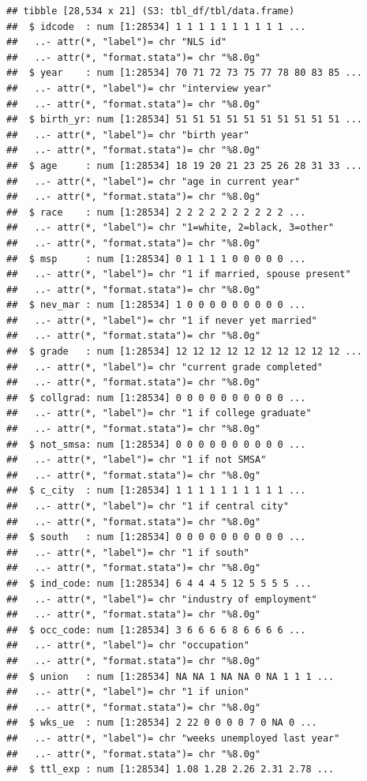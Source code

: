 \documentclass[
]{article}
\begin{document}
\begin{verbatim}
## tibble [28,534 x 21] (S3: tbl_df/tbl/data.frame)
##  $ idcode  : num [1:28534] 1 1 1 1 1 1 1 1 1 1 ...
##   ..- attr(*, "label")= chr "NLS id"
##   ..- attr(*, "format.stata")= chr "%8.0g"
##  $ year    : num [1:28534] 70 71 72 73 75 77 78 80 83 85 ...
##   ..- attr(*, "label")= chr "interview year"
##   ..- attr(*, "format.stata")= chr "%8.0g"
##  $ birth_yr: num [1:28534] 51 51 51 51 51 51 51 51 51 51 ...
##   ..- attr(*, "label")= chr "birth year"
##   ..- attr(*, "format.stata")= chr "%8.0g"
##  $ age     : num [1:28534] 18 19 20 21 23 25 26 28 31 33 ...
##   ..- attr(*, "label")= chr "age in current year"
##   ..- attr(*, "format.stata")= chr "%8.0g"
##  $ race    : num [1:28534] 2 2 2 2 2 2 2 2 2 2 ...
##   ..- attr(*, "label")= chr "1=white, 2=black, 3=other"
##   ..- attr(*, "format.stata")= chr "%8.0g"
##  $ msp     : num [1:28534] 0 1 1 1 1 0 0 0 0 0 ...
##   ..- attr(*, "label")= chr "1 if married, spouse present"
##   ..- attr(*, "format.stata")= chr "%8.0g"
##  $ nev_mar : num [1:28534] 1 0 0 0 0 0 0 0 0 0 ...
##   ..- attr(*, "label")= chr "1 if never yet married"
##   ..- attr(*, "format.stata")= chr "%8.0g"
##  $ grade   : num [1:28534] 12 12 12 12 12 12 12 12 12 12 ...
##   ..- attr(*, "label")= chr "current grade completed"
##   ..- attr(*, "format.stata")= chr "%8.0g"
##  $ collgrad: num [1:28534] 0 0 0 0 0 0 0 0 0 0 ...
##   ..- attr(*, "label")= chr "1 if college graduate"
##   ..- attr(*, "format.stata")= chr "%8.0g"
##  $ not_smsa: num [1:28534] 0 0 0 0 0 0 0 0 0 0 ...
##   ..- attr(*, "label")= chr "1 if not SMSA"
##   ..- attr(*, "format.stata")= chr "%8.0g"
##  $ c_city  : num [1:28534] 1 1 1 1 1 1 1 1 1 1 ...
##   ..- attr(*, "label")= chr "1 if central city"
##   ..- attr(*, "format.stata")= chr "%8.0g"
##  $ south   : num [1:28534] 0 0 0 0 0 0 0 0 0 0 ...
##   ..- attr(*, "label")= chr "1 if south"
##   ..- attr(*, "format.stata")= chr "%8.0g"
##  $ ind_code: num [1:28534] 6 4 4 4 5 12 5 5 5 5 ...
##   ..- attr(*, "label")= chr "industry of employment"
##   ..- attr(*, "format.stata")= chr "%8.0g"
##  $ occ_code: num [1:28534] 3 6 6 6 6 8 6 6 6 6 ...
##   ..- attr(*, "label")= chr "occupation"
##   ..- attr(*, "format.stata")= chr "%8.0g"
##  $ union   : num [1:28534] NA NA 1 NA NA 0 NA 1 1 1 ...
##   ..- attr(*, "label")= chr "1 if union"
##   ..- attr(*, "format.stata")= chr "%8.0g"
##  $ wks_ue  : num [1:28534] 2 22 0 0 0 0 7 0 NA 0 ...
##   ..- attr(*, "label")= chr "weeks unemployed last year"
##   ..- attr(*, "format.stata")= chr "%8.0g"
##  $ ttl_exp : num [1:28534] 1.08 1.28 2.26 2.31 2.78 ...

\end{verbatim}
\end{document}
